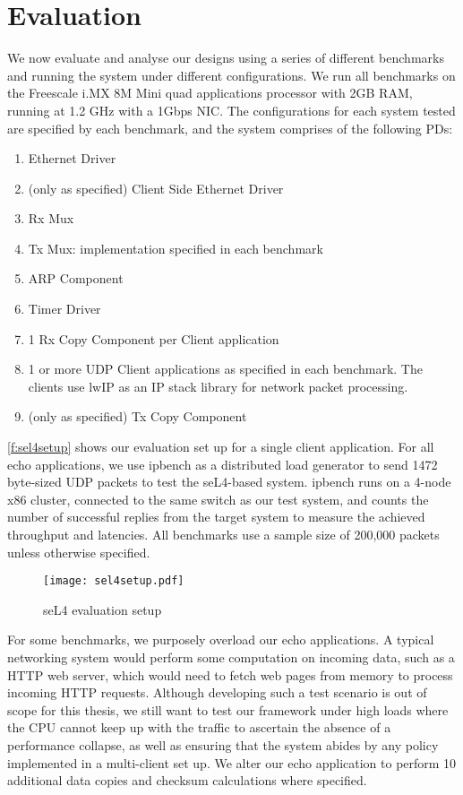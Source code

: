 \chapter{Evaluation}\label{ch:evaluation}

We now evaluate and analyse our designs using a series of different benchmarks and running
the system under different configurations. We run all benchmarks on the
Freescale i.MX 8M Mini quad applications processor with 2GB RAM, running at 1.2 GHz
with a 1Gbps NIC. The configurations for each system tested are specified by each benchmark,
and the system comprises of the following PDs:
\begin{enumerate}
    \item Ethernet Driver
    \item (only as specified) Client Side Ethernet Driver
    \item Rx Mux
    \item Tx Mux: implementation specified in each benchmark
    \item ARP Component
    \item Timer Driver
    \item 1 Rx Copy Component per Client application
    \item 1 or more UDP Client applications as specified in each benchmark. 
        The clients use lwIP \cite{Dunkels_01} as an IP stack library for network packet processing. 
    \item (only as specified) Tx Copy Component
\end{enumerate}

\autoref{f:sel4setup} shows our evaluation set up for a single client application.
For all echo applications, we use ipbench as a distributed load generator 
to send 1472 byte-sized UDP packets to test the seL4-based system. ipbench runs on a 4-node x86 cluster, 
connected to the same switch as our test system,
and counts the number of successful replies from the target system to measure the achieved throughput and latencies.
All benchmarks use a sample size of 200,000 packets unless otherwise specified. 

\begin{figure}[h]
    \centering
    \texttt{[image: sel4setup.pdf]}
    \caption{seL4 evaluation setup}
    \label{f:sel4setup}
\end{figure}

For some benchmarks, we purposely overload our echo applications. A typical networking system would
perform some computation on incoming data, such as a HTTP web server, which would need to fetch web pages from
memory to process incoming HTTP requests. Although developing such a test scenario is out of scope for this thesis,
we still want to test our framework under high loads where the CPU cannot keep up with the traffic to ascertain the absence
of a performance collapse, as well as ensuring that the system abides by any policy implemented in a multi-client set up. 
We alter our echo application to perform 10 additional data copies and checksum calculations where specified.

